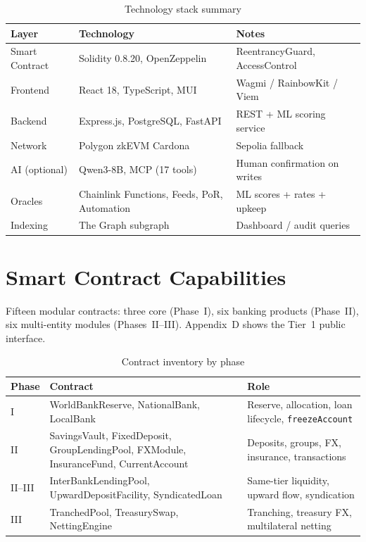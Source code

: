 \documentclass[12pt, a4paper]{report}
\newcommand{\tableheadcolor}{\rowcolor{TableHeadBg}}
\begin{document}
\begin{table}[H]
\centering
\caption[Technology stack summary]{Technology stack summary}
\label{tab:tech-stack}
\footnotesize
\begin{tabular}{p{3cm}p{4cm}p{6.5cm}}
\toprule
\tableheadcolor
\textbf{Layer} & \textbf{Technology} & \textbf{Notes} \\
\midrule
Smart Contract & Solidity 0.8.20, OpenZeppelin & ReentrancyGuard, AccessControl \\
Frontend & React 18, TypeScript, MUI & Wagmi / RainbowKit / Viem \\
Backend & Express.js, PostgreSQL, FastAPI & REST + ML scoring service \\
Network & Polygon zkEVM Cardona & Sepolia fallback \\
AI (optional) & Qwen3-8B, MCP (17 tools) & Human confirmation on writes \\
Oracles & Chainlink Functions, Feeds, PoR, Automation & ML scores + rates + upkeep \\
Indexing & The Graph subgraph & Dashboard / audit queries \\
\bottomrule
\end{tabular}
\end{table}

\chapter{Smart Contract Capabilities}

Fifteen modular contracts: three core (Phase~I), six banking products (Phase~II), six multi-entity modules (Phases~II--III). Appendix~D shows the Tier~1 public interface.

\begin{table}[H]
\centering
\caption[Contract inventory by phase]{Contract inventory by phase}
\label{tab:contract-inventory}
\footnotesize
\begin{tabular}{p{2.2cm}p{4.2cm}p{7.8cm}}
\toprule
\tableheadcolor
\textbf{Phase} & \textbf{Contract} & \textbf{Role} \\
\midrule
I & WorldBankReserve, NationalBank, LocalBank & Reserve, allocation, loan lifecycle, \texttt{freezeAccount} \\
II & SavingsVault, FixedDeposit, GroupLendingPool, FXModule, InsuranceFund, CurrentAccount & Deposits, groups, FX, insurance, transactions \\
II--III & InterBankLendingPool, UpwardDepositFacility, SyndicatedLoan & Same-tier liquidity, upward flow, syndication \\
III & TranchedPool, TreasurySwap, NettingEngine & Tranching, treasury FX, multilateral netting \\
\bottomrule
\end{tabular}
\end{table}
\end{document}
